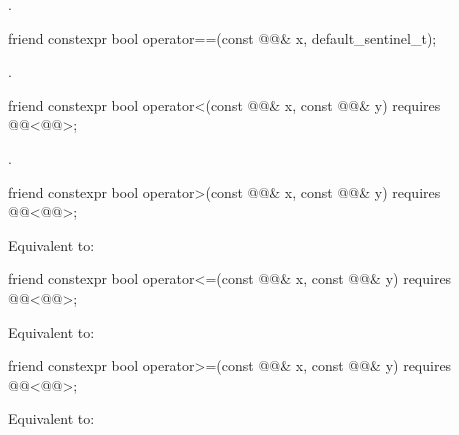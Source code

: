 \begin{itemdescr}
\pnum
\returns
{}.
\end{itemdescr}

\begin{itemdecl}
friend constexpr bool operator==(const @@& x, default_sentinel_t);
\end{itemdecl}

\begin{itemdescr}
\pnum
\returns
{}.
\end{itemdescr}

\begin{itemdecl}
friend constexpr bool operator<(const @@& x, const @@& y)
  requires @@<@@>;
\end{itemdecl}

\begin{itemdescr}
\pnum
\returns
{}.
\end{itemdescr}

\begin{itemdecl}
friend constexpr bool operator>(const @@& x, const @@& y)
  requires @@<@@>;
\end{itemdecl}

\begin{itemdescr}
\pnum
\effects
Equivalent to: 
\end{itemdescr}

\begin{itemdecl}
friend constexpr bool operator<=(const @@& x, const @@& y)
  requires @@<@@>;
\end{itemdecl}

\begin{itemdescr}
\pnum
\effects
Equivalent to: 
\end{itemdescr}

\begin{itemdecl}
friend constexpr bool operator>=(const @@& x, const @@& y)
  requires @@<@@>;
\end{itemdecl}

\begin{itemdescr}
\pnum
\effects
Equivalent to: 
\end{itemdescr}

